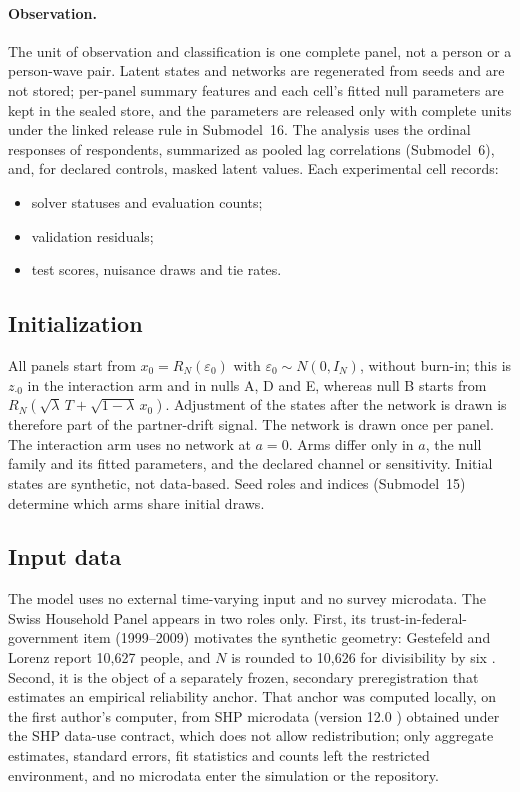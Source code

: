 \paragraph{Observation.}
The unit of observation and classification is one complete panel, not a person or a person-wave pair. Latent states and networks are regenerated from seeds and are not stored; per-panel summary features and each cell's fitted null parameters are kept in the sealed store, and the parameters are released only with complete units under the linked release rule in Submodel~16. %
The analysis uses the ordinal responses of respondents, summarized as pooled lag correlations (Submodel~6), and, for declared controls, masked latent values. Each experimental cell records:
\begin{itemize}
\item solver statuses and evaluation counts;
\item validation residuals;
\item test scores, nuisance draws and tie rates.
\end{itemize}

\subsection{Initialization}

All panels start from $x_0=R_N(\varepsilon_0)$ with $\varepsilon_0\sim N(0,I_N)$, without burn-in; this is $z_{\cdot0}$ in the interaction arm and in nulls A, D and E, whereas null B starts from $R_N(\sqrt\lambda\,T+\sqrt{1-\lambda}\,x_0)$. Adjustment of the states after the network is drawn is therefore part of the partner-drift signal. The network is drawn once per panel. The interaction arm uses no network at $a=0$. Arms differ only in $a$, the null family and its fitted parameters, and the declared channel or sensitivity. Initial states are synthetic, not data-based. Seed roles and indices (Submodel~15) determine which arms share initial draws.

\subsection{Input data}

The model uses no external time-varying input and no survey microdata. The Swiss Household Panel appears in two roles only. First, its trust-in-federal-government item  (1999--2009) motivates the synthetic geometry: Gestefeld and Lorenz report 10,627 people, and $N$ is rounded to 10,626 for divisibility by six \cite{gestefeld2023}. Second, it is the object of a separately frozen, secondary preregistration that estimates an empirical reliability anchor. That anchor was computed locally, on the first author's computer, from SHP microdata (version 12.0 \cite{shpgroup2026data}) obtained under the SHP data-use contract, which does not allow redistribution; only aggregate estimates, standard errors, fit statistics and counts left the restricted environment, and no microdata enter the simulation or the repository.


